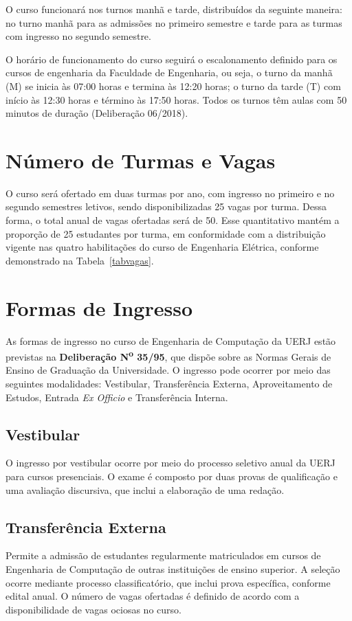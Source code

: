 O curso funcionará nos turnos manhã e tarde, distribuídos da seguinte maneira: no turno manhã para as admissões no primeiro semestre e tarde para as turmas com ingresso no segundo semestre.

O horário de funcionamento do curso seguirá o escalonamento definido para os cursos de engenharia da Faculdade de Engenharia, ou seja, o turno da manhã (M) se inicia às 07:00 horas e termina às 12:20 horas; o turno da tarde (T) com início às 12:30 horas e término às 17:50 horas. Todos os turnos têm aulas com 50 minutos de duração (Deliberação  06/2018).

\section{Número de Turmas e Vagas}
O curso será ofertado em duas turmas por ano, com ingresso no primeiro e no segundo semestres letivos, sendo disponibilizadas 25 vagas por turma. Dessa forma, o total anual de vagas ofertadas será de 50. Esse quantitativo mantém a proporção de 25 estudantes por turma, em conformidade com a distribuição vigente nas quatro habilitações do curso de Engenharia Elétrica, conforme demonstrado na Tabela~\ref{tabvagas}.

\section{Formas de Ingresso}
\label{sec:forma-ingresso}

As formas de ingresso no curso de Engenharia de Computação da UERJ estão previstas na \textbf{Deliberação N\textsuperscript{o} 35/95}, que dispõe sobre as Normas Gerais de Ensino de Graduação da Universidade. O ingresso pode ocorrer por meio das seguintes modalidades: Vestibular, Transferência Externa, Aproveitamento de Estudos, Entrada \textit{Ex Officio} e Transferência Interna.

\subsection{Vestibular}
O ingresso por vestibular ocorre por meio do processo seletivo anual da UERJ para cursos presenciais. O exame é composto por duas provas de qualificação e uma avaliação discursiva, que inclui a elaboração de uma redação.

\subsection{Transferência Externa}
Permite a admissão de estudantes regularmente matriculados em cursos de Engenharia de Computação de outras instituições de ensino superior. A seleção ocorre mediante processo classificatório, que inclui prova específica, conforme edital anual. O número de vagas ofertadas é definido de acordo com a disponibilidade de vagas ociosas no curso.

